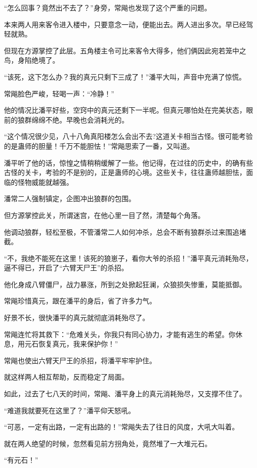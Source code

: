 \begin{this_body}
“怎么回事？竟然出不去了？”身旁，常飚也发现了这个严重的问题。

本来两人用来客令进入楼中，只要意念一动，便能出去。两人进出多次。早已经驾轻就熟。

但现在方源掌控了此层。五角楼主令可比来客令大得多，他们俩因此宛若笼中之鸟，身陷绝境了。

“该死，这下怎么办？我的真元只剩下三成了！”潘平大叫，声音中充满了惊慌。

常飚脸色严峻，轻喝一声：“冷静！”

他的情况比潘平好些，空窍中的真元还剩下一半呢。但真元哪怕处在完美状态，眼前的狼群绵绵不绝。早晚也会消耗光的。

“这个情况很少见，八十八角真阳楼怎么会出不去?这道关卡相当古怪。很可能考验的是蛊师的胆量！千万不能胆怯！”常飚思索了一番，又叫道。

潘平听了他的话，惊惶之情稍稍缓解了一些。他记得，在过往的历史中，的确有些古怪的关卡，考验的不是别的，正是蛊师的心境。这些关卡，往往蛊师越胆怯，面临的怪物威能就越强。

潘常二人强制镇定，企图冲出狼群的包围。

但方源掌控此关，所谓迷宫，在他心里一目了然，清楚每个角落。

他调动狼群，轻松至极，不管潘常二人如何冲杀，总会不断有狼群杀过来围追堵截。

“不，我绝不能死在这里！该死的狼崽子，看你大爷的杀招！”潘平真元消耗殆尽，逼不得已，开启了“六臂天尸王”的杀招。

他化身成八臂僵尸，战力暴涨，所到之处掀起狂澜，众狼损失惨重，莫能抵御。

常飚珍惜真元，跟在潘平的身后，省了许多力气。

好景不长，很快潘平的真元就彻底消耗殆尽了。

常飚连忙将其救下：“危难关头，你我只有同心协力，才能有逃生的希望。你休息，用元石恢复真元，我来保护你！”

常飚也使出六臂天尸王的杀招，将潘平牢牢护住。

就这样两人相互帮助，反而稳定了局面。

如此，过去了七八天的时间，常飚、潘平身上的真元消耗殆尽，又支撑不住了。

“难道我就要死在这里了？”潘平仰天怒吼。

“可恶，一定有出路，一定有出路的！”常飚失去了往日的风度，大吼大叫着。

就在两人绝望的时候，忽然看见前方拐角处，竟然堆了一大堆元石。

“有元石！”


\end{this_body}
